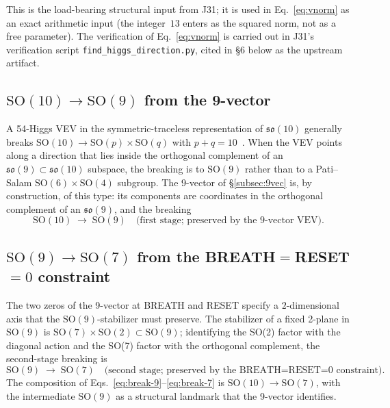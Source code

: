 This is the load-bearing structural input from J31; it is used in
Eq.~\eqref{eq:vnorm} as an exact arithmetic input (the integer~$13$
enters as the squared norm, not as a free parameter). The verification
of Eq.~\eqref{eq:vnorm} is carried out in J31's verification script
\texttt{find\_higgs\_direction.py}, cited in §6 below as the upstream
artifact.

\subsection{$\mathrm{SO}(10) \to \mathrm{SO}(9)$ from the 9-vector}
\label{subsec:so10so9}

A 54-Higgs VEV in the symmetric-traceless representation of
$\mathfrak{so}(10)$ generally breaks $\mathrm{SO}(10) \to \mathrm{SO}(p) \times \mathrm{SO}(q)$
with $p + q = 10$~\cite{Slansky1981}. When the VEV points along a
direction that lies inside the orthogonal complement of an
$\mathfrak{so}(9) \subset \mathfrak{so}(10)$ subspace, the breaking is to
$\mathrm{SO}(9)$ rather than to a Pati--Salam $\mathrm{SO}(6) \times \mathrm{SO}(4)$ subgroup.
The 9-vector of §\ref{subsec:9vec} is, by construction, of this type:
its components are coordinates in the orthogonal complement of an
$\mathfrak{so}(9)$, and the breaking
\begin{equation}
\mathrm{SO}(10) \;\longrightarrow\; \mathrm{SO}(9)
\quad\text{(first stage; preserved by the 9-vector VEV).}
\label{eq:break-9}
\end{equation}

\subsection{$\mathrm{SO}(9) \to \mathrm{SO}(7)$ from the BREATH$=$RESET$=0$
constraint}
\label{subsec:so9so7}

The two zeros of the 9-vector at BREATH and RESET specify a
$2$-dimensional axis that the $\mathrm{SO}(9)$-stabilizer must preserve. The
stabilizer of a fixed 2-plane in $\mathrm{SO}(9)$ is
$\mathrm{SO}(7) \times \mathrm{SO}(2) \subset \mathrm{SO}(9)$; identifying the SO(2) factor with
the diagonal action and the SO(7) factor with the orthogonal complement,
the second-stage breaking is
\begin{equation}
\mathrm{SO}(9) \;\longrightarrow\; \mathrm{SO}(7)
\quad\text{(second stage; preserved by the BREATH=RESET=0 constraint).}
\label{eq:break-7}
\end{equation}
The composition of Eqs.~\eqref{eq:break-9}--\eqref{eq:break-7} is
$\mathrm{SO}(10) \to \mathrm{SO}(7)$, with the intermediate $\mathrm{SO}(9)$ as a structural
landmark that the 9-vector identifies.

